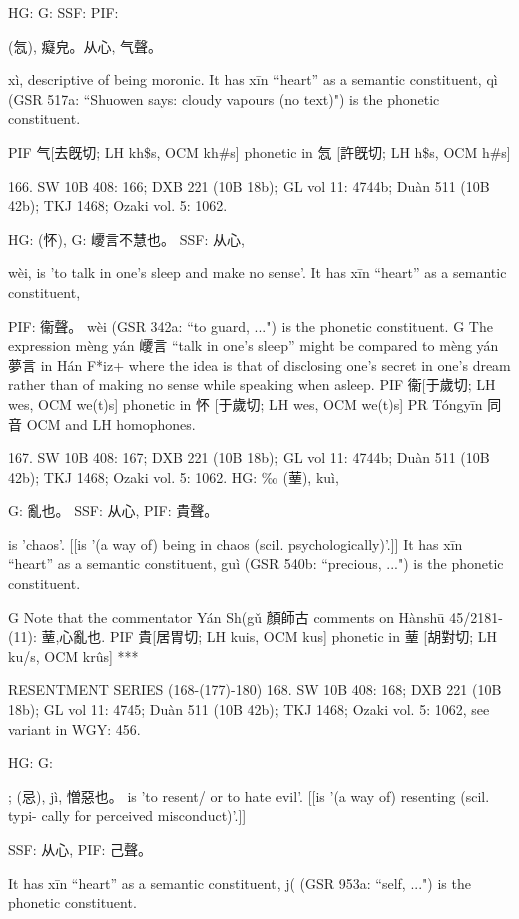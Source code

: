 HG:
G: SSF: PIF:

  (忥),
癡皃。从心, 气聲。


xì,
descriptive of being moronic.
It has xīn ``heart'' as a semantic constituent,
qì (GSR 517a: ``Shuowen says: cloudy vapours (no text)") is the phonetic constituent.

PIF     气[去旣切; LH kh\$s, OCM kh\#s] phonetic in 忥 [許旣切; LH h\$s, OCM h\#s]

166. SW 10B 408: 166; DXB 221 (10B 18b); GL vol 11: 4744b; Duàn 511 (10B 42b); TKJ 1468; Ozaki vol. 5: 1062.


HG:	(怀),
G:	巎言不慧也。
SSF: 从心,

wèi,
is 'to talk in one's sleep and make no sense'. It has xīn ``heart'' as a semantic constituent,



PIF: 衞聲。       wèi (GSR 342a: ``to guard, ...") is the phonetic constituent.
G The expression mèng yán 巎言 ``talk in one's sleep'' might be compared to mèng yán 夢言 in Hán F*iz+ where the idea is that of disclosing one's secret in one's dream rather than of making no sense while speaking when asleep.
PIF     衞[于歲切; LH wes, OCM we(t)s] phonetic in 怀 [于歲切; LH wes, OCM we(t)s]
PR	Tóngyīn 同音 OCM and LH homophones.

167. SW 10B 408: 167; DXB 221 (10B 18b); GL vol 11: 4744b; Duàn 511 (10B 42b); TKJ 1468; Ozaki vol. 5: 1062.
HG: ‰ (䓰), kuì,

G:	亂也。
SSF: 从心,
PIF: 貴聲。

is 'chaos'. [[is '(a way of) being in chaos (scil. psychologically)'.]] It has xīn ``heart'' as a semantic constituent,
guì (GSR 540b: ``precious, ...") is the phonetic constituent.

G	Note that the commentator Yán Sh(gǔ 顏師古 comments on Hànshū 45/2181-(11): 䓰,心亂也.
PIF     貴[居胃切; LH kuis, OCM kus] phonetic in 䓰 [胡對切; LH ku/s, OCM krûs]
***

RESENTMENT SERIES (168-(177)-180)
168. SW 10B 408: 168; DXB 221 (10B 18b); GL vol 11: 4745; Duàn 511 (10B 42b); TKJ 1468; Ozaki vol. 5: 1062, see
variant in WGY: 456.


HG:
G:

; (忌), jì,
憎惡也。 is 'to resent/ or to hate evil'. [[is '(a way of) resenting (scil. typi- cally for perceived misconduct)'.]]

SSF: 从心,
PIF: 己聲。

It has xīn ``heart'' as a semantic constituent,
j( (GSR 953a: ``self, ...") is the phonetic constituent.

